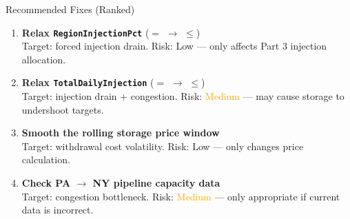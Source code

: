 \documentclass[aspectratio=169, 11pt]{beamer}
\begin{document}
\begin{frame}{Recommended Fixes (Ranked)}
  \begin{enumerate}
    \item \textbf{Relax \texttt{RegionInjectionPct}} ($=$ $\to$ $\leq$) \\
      {\small Target: forced injection drain. Risk: \textcolor{okgreen}{Low} --- only affects Part 3 injection allocation.}
    \vspace{0.4em}
    \item \textbf{Relax \texttt{TotalDailyInjection}} ($=$ $\to$ $\leq$) \\
      {\small Target: injection drain + congestion. Risk: \textcolor{orange}{Medium} --- may cause storage to undershoot targets.}
    \vspace{0.4em}
    \item \textbf{Smooth the rolling storage price window} \\
      {\small Target: withdrawal cost volatility. Risk: \textcolor{okgreen}{Low} --- only changes price calculation.}
    \vspace{0.4em}
    \item \textbf{Check PA $\to$ NY pipeline capacity data} \\
      {\small Target: congestion bottleneck. Risk: \textcolor{orange}{Medium} --- only appropriate if current data is incorrect.}
  \end{enumerate}
\end{frame}
\end{document}
